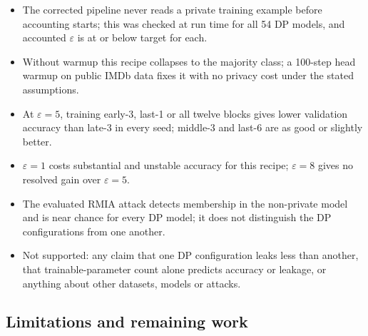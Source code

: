 \documentclass[11pt,a4paper]{article}
\begin{document}
\begin{itemize}
  \item The corrected pipeline never reads a private training example before accounting starts; this was
        checked at run time for all 54 DP models, and accounted $\varepsilon$ is at or below target for each.
  \item Without warmup this recipe collapses to the majority class; a 100-step head warmup on public IMDb data
        fixes it with no privacy cost under the stated assumptions.
  \item At $\varepsilon = 5$, training early-3, last-1 or all twelve blocks gives lower validation accuracy
        than late-3 in every seed; middle-3 and last-6 are as good or slightly better.
  \item $\varepsilon = 1$ costs substantial and unstable accuracy for this recipe; $\varepsilon = 8$ gives no
        resolved gain over $\varepsilon = 5$.
  \item The evaluated RMIA attack detects membership in the non-private model and is near chance for every DP
        model; it does not distinguish the DP configurations from one another.
  \item Not supported: any claim that one DP configuration leaks less than another, that trainable-parameter
        count alone predicts accuracy or leakage, or anything about other datasets, models or attacks.
\end{itemize}

\subsection{Limitations and remaining work}
\end{document}
